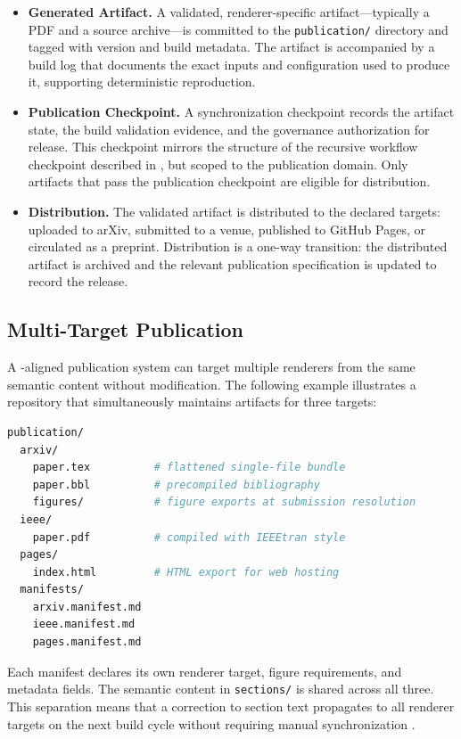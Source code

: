 \begin{itemize}
  \item \textbf{Generated Artifact.} A validated, renderer-specific artifact---typically a PDF and a source archive---is committed to the \texttt{publication/} directory and tagged with version and build metadata. The artifact is accompanied by a build log that documents the exact inputs and configuration used to produce it, supporting deterministic reproduction.

  \item \textbf{Publication Checkpoint.} A synchronization checkpoint records the artifact state, the build validation evidence, and the governance authorization for release. This checkpoint mirrors the structure of the recursive workflow checkpoint described in , but scoped to the publication domain. Only artifacts that pass the publication checkpoint are eligible for distribution.

  \item \textbf{Distribution.} The validated artifact is distributed to the declared targets: uploaded to arXiv, submitted to a venue, published to GitHub Pages, or circulated as a preprint. Distribution is a one-way transition: the distributed artifact is archived and the relevant publication specification is updated to record the release.
\end{itemize}

\subsection{Multi-Target Publication}

A -aligned publication system can target multiple renderers from the same semantic content without modification. The following example illustrates a repository that simultaneously maintains artifacts for three targets:

\begin{lstlisting}[language=bash, caption={Multi-target publication artifact layout.}, label={lst:multi-target}]
publication/
  arxiv/
    paper.tex          # flattened single-file bundle
    paper.bbl          # precompiled bibliography
    figures/           # figure exports at submission resolution
  ieee/
    paper.pdf          # compiled with IEEEtran style
  pages/
    index.html         # HTML export for web hosting
  manifests/
    arxiv.manifest.md
    ieee.manifest.md
    pages.manifest.md
\end{lstlisting}

Each manifest declares its own renderer target, figure requirements, and metadata fields. The semantic content in \texttt{sections/} is shared across all three. This separation means that a correction to section text propagates to all renderer targets on the next build cycle without requiring manual synchronization \cite{Chandy1985DistributedSnapshots}.

